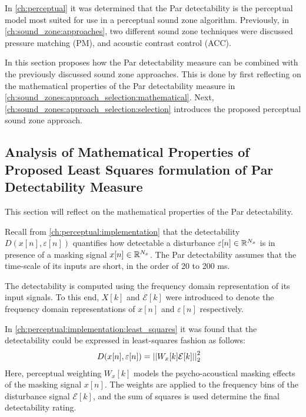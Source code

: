 In \autoref{ch:perceptual} it was determined that the Par detectability is the perceptual model most suited for use in a 
perceptual sound zone algorithm.
Previously, in \autoref{ch:sound_zone:approaches}, two different sound zone techniques were discussed 
pressure matching (PM), and acoustic contrast control (ACC). 

In this section proposes how the Par detectability measure can be combined with the previously discussed sound zone approaches.
This is done by first reflecting on the mathematical properties of the Par detectability measure 
in \autoref{ch:sound_zones:approach_selection:mathematical}.
Next, \autoref{ch:sound_zones:approach_selection:selection} introduces the proposed perceptual sound zone approach.

\subsection{Analysis of Mathematical Properties of Proposed Least Squares formulation of Par Detectability Measure}
\label{ch:sound_zones:approach_selection:mathematical}
This section will reflect on the mathematical properties of the Par detectability.

Recall from \autoref{ch:perceptual:implementation} that the detectability $D(x[n],\varepsilon[n])$ quantifies how detectable a disturbance
$\varepsilon[n]\in\mathbb{R}^{N_x}$ is in presence of a masking signal $x[n]\in\mathbb{R}^{N_x}$.
The Par detectability assumes that the time-scale of its inputs are short, in the order of 20 to 200 ms.

The detectability is computed using the frequency domain representation of its input signals.
To this end, $X[k]$ and $\mathcal{E}[k]$ were introduced to denote the frequency domain representations of $x[n]$ and $\varepsilon[n]$ respectively.

In \autoref{ch:perceptual:implementation:least_squares} it was found that the detectability could be expressed in least-squares fashion as follows:
\begin{align}
    D(x[n],\varepsilon[n]) &= \norm[2][2]{W_x[k]\mathcal{E}[k]} 
    \label{eq:perceptual:approach_selection:detectability}
\end{align}
Here, perceptual weighting $W_x[k]$ models the psycho-acoustical masking effects of the masking signal $x[n]$.
The weights are applied to the frequency bins of the disturbance signal $\mathcal{E}[k]$, and the sum of squares is used determine the final detectability rating.

